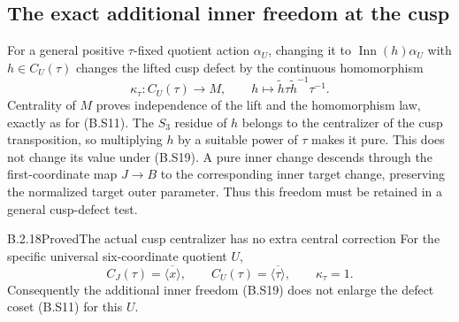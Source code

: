 \subsection{The exact additional inner freedom at the cusp}

For a general positive $\tau$-fixed quotient action
$\alpha_U$, changing it to $\operatorname{Inn}(h)\alpha_U$
with $h\in C_U(\tau)$ changes the lifted cusp defect
by the continuous homomorphism
\[
 \kappa_\tau:C_U(\tau)\longrightarrow M,
 \qquad h\longmapsto
             \widetilde h\tau\widetilde h^{-1}\tau^{-1}.        \tag{B.S19}
\]
Centrality of $M$ proves independence of the lift and the
homomorphism law, exactly as for (B.S11).  The $S_3$
residue of $h$ belongs to the centralizer of the cusp
transposition, so multiplying $h$ by a suitable power
of $\tau$ makes it pure.  This does not change its
value under (B.S19).  A pure inner change descends
through the first-coordinate map $J\to B$ to the
corresponding inner target change, preserving the
normalized target outer parameter.  Thus this freedom
must be retained in a general cusp-defect test.

\begin{result}{B.2.18}{Proved}{The actual cusp centralizer has no extra central correction}
For the specific universal six-coordinate quotient $U$,
\[
                   C_J(\tau)=\overline{\langle x\rangle},
       \qquad C_U(\tau)=\overline{\langle\tau\rangle},
       \qquad \kappa_\tau=1.                                 \tag{B.S20}
\]
Consequently the additional inner freedom (B.S19)
does not enlarge the defect coset (B.S11) for this $U$.
\end{result}

